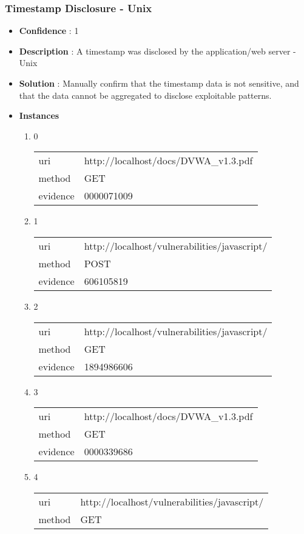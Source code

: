 \documentclass[10pt]{article}
\begin{document}
\subsubsection{Timestamp Disclosure - Unix}
\begin{itemize}
\item[] \textbf{Confidence} : 1
\item[] \textbf{Description} : A timestamp was disclosed by the application/web server - Unix
\item[] \textbf{Solution} :  Manually confirm that the timestamp data is not sensitive, and that the data cannot be aggregated to disclose exploitable patterns.
\item[] \textbf{Instances}
\begin{enumerate}
\item[] 0
\begin{tabular}{| l | p{12cm}}
uri & http://localhost/docs/DVWA\_v1.3.pdf \\
method & GET \\
evidence & 0000071009 \\
\end{tabular}
\item[] 1
\begin{tabular}{| l | p{12cm}}
uri & http://localhost/vulnerabilities/javascript/ \\
method & POST \\
evidence & 606105819 \\
\end{tabular}
\item[] 2
\begin{tabular}{| l | p{12cm}}
uri & http://localhost/vulnerabilities/javascript/ \\
method & GET \\
evidence & 1894986606 \\
\end{tabular}
\item[] 3
\begin{tabular}{| l | p{12cm}}
uri & http://localhost/docs/DVWA\_v1.3.pdf \\
method & GET \\
evidence & 0000339686 \\
\end{tabular}
\item[] 4
\begin{tabular}{| l | p{12cm}}
uri & http://localhost/vulnerabilities/javascript/ \\
method & GET \\

\end{tabular}
\end{enumerate}
\end{itemize}
\end{document}
